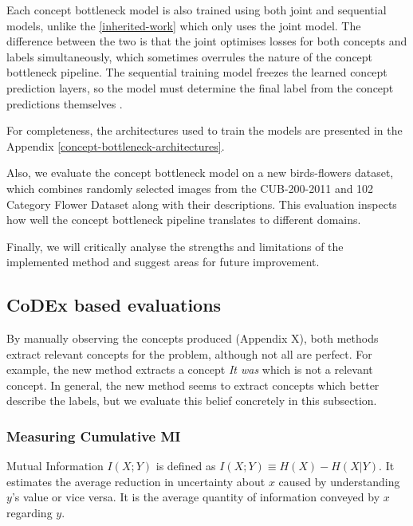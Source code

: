 Each concept bottleneck model is also trained using both joint and sequential models, unlike the \ref{inherited-work} which only uses the joint model.
The difference between the two is that the joint optimises losses for both concepts and labels simultaneously, which sometimes overrules the nature of the concept bottleneck pipeline.
The sequential training model freezes the learned concept prediction layers, so the model must determine the final label from the concept predictions themselves \cite{RefWorks:RefID:68-margeloiu2021concept}.

For completeness, the architectures used to train the models are presented in the Appendix \ref{concept-bottleneck-architectures}.

Also, we evaluate the concept bottleneck model on a new birds-flowers dataset, which combines randomly selected images from the CUB-200-2011 \cite{RefWorks:RefID:69-wah2011caltech-ucsd} and 102 Category Flower Dataset \cite{RefWorks:RefID:70-nilsback2008automated} along with their descriptions.
This evaluation inspects how well the concept bottleneck pipeline translates to different domains.

Finally, we will critically analyse the strengths and limitations of the implemented method and suggest areas for future improvement.

\subsection{CoDEx based evaluations}

By manually observing the concepts produced (Appendix X), both methods extract relevant concepts for the problem, although not all are perfect.
For example, the new method extracts a concept \emph{It was} which is not a relevant concept.
In general, the new method seems to extract concepts which better describe the labels, but we evaluate this belief concretely in this subsection.


\subsubsection{Measuring Cumulative MI}

Mutual Information $I(X;Y)$ \cite{RefWorks:RefID:30-mackay2004information} is defined as $I(X; Y) \equiv H(X) - H(X|Y)$. 
It estimates the average reduction in uncertainty about $x$ caused by understanding $y$'s value or vice versa. 
It is the average quantity of information conveyed by $x$ regarding $y$.


